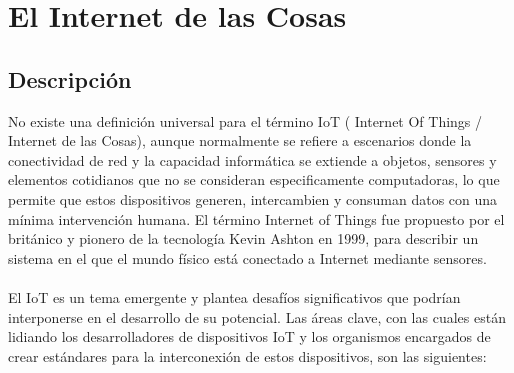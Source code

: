 \section{El Internet de las Cosas} %
\subsection{Descripción} %
No existe una definición universal para el término IoT ( Internet Of Things / Internet de las Cosas), aunque normalmente se refiere a escenarios donde la conectividad de red y la capacidad informática se extiende a objetos, sensores y elementos cotidianos que no se consideran especificamente computadoras, lo que permite que estos dispositivos generen, intercambien y consuman datos con una mínima intervención humana. 
El término Internet of Things fue propuesto por el británico y pionero de la tecnología Kevin Ashton en 1999, para describir un sistema en el que el mundo físico está conectado a Internet mediante sensores.
\\\\El IoT es un tema emergente y plantea desafíos significativos que podrían interponerse en el desarrollo de su potencial. Las áreas clave, con las cuales están lidiando los desarrolladores de dispositivos IoT y los organismos encargados de crear estándares para la interconexión de estos dispositivos, son las siguientes:
